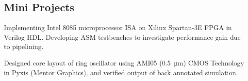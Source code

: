 \documentclass[]{deedy}
\begin{document}
\begin{minipage}[t]{0.72\textwidth}
\begin{flushleft}
\section{Mini Projects}
%
\begin{tightemize}
\item Implementing Intel 8085 microprocessor ISA on Xilinx Spartan-3E FPGA in Verilog HDL. Developing ASM testbenches to investigate performance gain due to pipelining.
\end{tightemize}
\sectionsep
%
\begin{tightemize}
\item Designed core layout of ring oscillator using AMI05 (\SI{0.5}{\micro\metre}) CMOS Technology in Pyxis (Mentor Graphics), and verified output of back annotated simulation.
\end{tightemize}
\sectionsep
\end{flushleft}
\end{minipage}
%
\pagebreak
%
\end{document}
